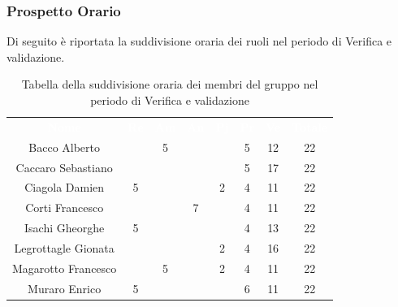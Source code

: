 \subsubsection{Prospetto Orario}
Di seguito è riportata la suddivisione oraria dei ruoli nel periodo di Verifica e validazione.




\begin{table}[H]	
	\begin{center}
	    \begin{tabular}{cccccccc}
			\rowcolor{greySWEight}
			\textcolor{white}{\textbf{Nome}} & \textcolor{white}{\textbf{Re}} & \textcolor{white}{\textbf{Am}} & \textcolor{white}{\textbf{An}} & \textcolor{white}{\textbf{Pj}} & \textcolor{white}{\textbf{Pr}} & \textcolor{white}{\textbf{Ve}} & \textcolor{white}{\textbf{Totale}}
			\\
			Bacco Alberto & & 5 & & & 5 & 12 & 22 \\
			Caccaro Sebastiano & & & & & 5 & 17 & 22 \\
			Ciagola Damien & 5 & & & 2 & 4 & 11 & 22 \\
			Corti Francesco & & & 7 & & 4 & 11 & 22 \\
			Isachi Gheorghe & 5 & & & & 4 & 13 & 22 \\
			Legrottagle Gionata & & & & 2 & 4 & 16 & 22 \\
			Magarotto Francesco & & 5 & & 2 & 4 & 11 & 22 \\
			Muraro Enrico & 5 & & & & 6 & 11 & 22 \\
			\end{tabular}
	    \caption{Tabella della suddivisione oraria dei membri del gruppo nel periodo di Verifica e validazione} \label{tab:tabellaPersoneVerifica e validazione} 
	\end{center}
\end{table}

